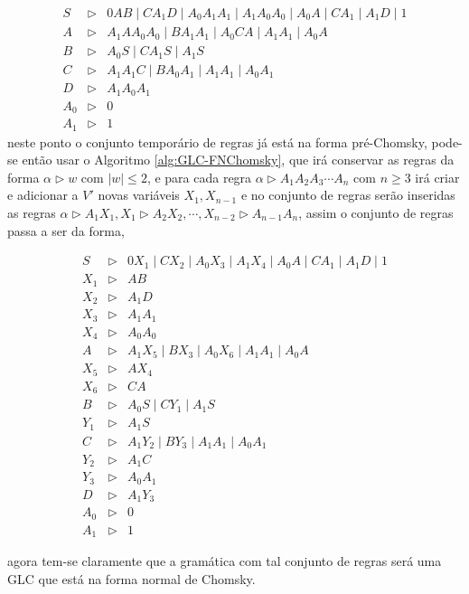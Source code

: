 \begin{example}
    \begin{eqnarray*}
        S & \rhd & 0AB \mid CA_1D \mid A_0A_1A_1 \mid A_1A_0A_0 \mid A_0A \mid CA_1 \mid A_1D \mid 1\\
        A & \rhd & A_1AA_0A_0 \mid BA_1A_1 \mid A_0CA \mid A_1A_1 \mid A_0A\\
        B & \rhd & A_0S \mid CA_1S \mid A_1S\\
        C & \rhd & A_1A_1C \mid BA_0A_1 \mid A_1A_1 \mid A_0A_1\\
        D & \rhd & A_1A_0A_1\\
        A_0 & \rhd & 0 \\
        A_1 & \rhd & 1
    \end{eqnarray*}
    neste ponto o conjunto temporário de regras já está na forma pré-Chomsky, pode-se então usar o Algoritmo \ref{alg:GLC-FNChomsky}, que irá conservar as regras da forma $\alpha \rhd w$ com $|w| \leq 2$, e  para cada regra $\alpha \rhd A_1A_2A_3\cdots A_n$ com $n \geq 3$ irá criar e adicionar a $V'$ novas variáveis $X_1, X_{n-1}$ e no conjunto de regras serão inseridas as regras $\alpha \rhd A_1X_1, X_1 \rhd A_2X_2, \cdots, X_{n-2} \rhd A_{n-1}A_n$, assim o conjunto de regras passa a ser da forma,
    
    \begin{eqnarray*}
        S & \rhd & 0X_1 \mid CX_2 \mid A_0X_3 \mid A_1X_4 \mid A_0A \mid CA_1 \mid A_1D \mid 1\\
        X_1 & \rhd & AB \\
        X_2 & \rhd & A_1D\\
        X_3 & \rhd & A_1A_1\\
        X_4 & \rhd & A_0A_0\\
        A & \rhd & A_1X_5 \mid BX_3 \mid A_0X_6 \mid A_1A_1 \mid A_0A\\
        X_5 & \rhd & AX_4\\
        X_6 & \rhd & CA\\
        B & \rhd & A_0S \mid CY_1 \mid A_1S\\
        Y_1 & \rhd & A_1S\\
        C & \rhd & A_1Y_2 \mid BY_3 \mid A_1A_1 \mid A_0A_1\\
        Y_2 & \rhd & A_1C\\
        Y_3 & \rhd & A_0A_1\\
        D & \rhd & A_1Y_3\\
        A_0 & \rhd & 0 \\
        A_1 & \rhd & 1
    \end{eqnarray*}
    
    agora tem-se claramente que a gramática com tal conjunto de regras será uma GLC que está na forma normal de Chomsky. 
\end{example}

